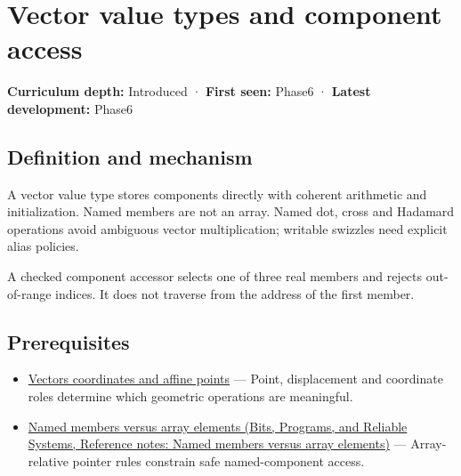 \hypertarget{appendix-37a39984ba66}{}\label{referencestart:appendix-37a39984ba66}
\section{Vector value types and component access}\label{appendix-37a39984ba66-vector-value-types-and-component-access}

\hypertarget{appendix-37a39984ba66-vector-value-types-and-component-access}{}

\textbf{Curriculum depth:} Introduced · \textbf{First seen:} Phase6 · \textbf{Latest development:} Phase6

\begin{allmightroledefinition}

\subsection{Definition and mechanism}\label{appendix-37a39984ba66-definition-and-mechanism}

\hypertarget{appendix-37a39984ba66-definition-and-mechanism}{}

A vector value type stores components directly with coherent arithmetic and initialization. Named members are not an array. Named dot, cross and Hadamard operations avoid ambiguous vector multiplication; writable swizzles need explicit alias policies.

\end{allmightroledefinition}

A checked component accessor selects one of three real members and rejects out-of-range indices. It does not traverse from the address of the first member.

\subsection{Prerequisites}\label{appendix-37a39984ba66-prerequisites}

\hypertarget{appendix-37a39984ba66-prerequisites}{}

\begin{itemize}
\tightlist
\item
  \hyperref[appendix-0659864c0aa3]{Vectors coordinates and affine points} --- Point, displacement and coordinate roles determine which geometric operations are meaningful.
\item
  \href{../01-Bits-Programs-and-Reliable-Systems/main.pdf\#nameddest=appendix-3f7e15effba6}{Named members versus array elements (Bits, Programs, and Reliable Systems, Reference notes: Named members versus array elements)} --- Array-relative pointer rules constrain safe named-component access.
\end{itemize}

